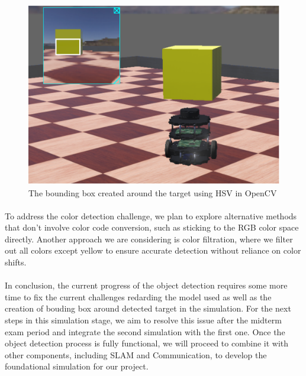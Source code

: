\begin{figure}[H]
    \centering
    \includegraphics[width=0.8\linewidth]{assets/images/object_detection/Figure5.png}
    \caption{The bounding box created around the target using HSV in OpenCV}
    \label{fig:object detection figure 5.} 
\end{figure}

\paragraph* {}
To address the color detection challenge, we plan to explore alternative methods that don’t involve color code conversion, such as sticking to the RGB color space directly. Another approach we are considering is color filtration, where we filter out all colors except yellow to ensure accurate detection without reliance on color shifts.

\paragraph*{}
In conclusion, the current progress of the object detection requires some more time to fix the current challenges redarding the model used as well as the creation of bouding box around detected target in the simulation. For the next steps in this simulation stage, we aim to resolve this issue after the midterm exam period and integrate the second simulation with the first one. Once the object detection process is fully functional, we will proceed to combine it with other components, including SLAM and Communication, to develop the foundational simulation for our project.